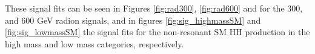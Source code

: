 These signal fits can be seen in Figures \ref{fig:rad300}, \ref{fig:rad600} and for the 300, and 600 GeV radion signals, and in figures \ref{fig:sig_highmassSM} and \ref{fig:sig_lowmassSM} the signal fits for the non-resonant SM HH production in the high mass and low mass categories, respectively.


